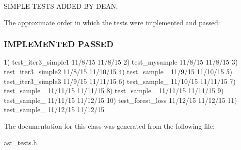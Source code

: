 S\-I\-M\-P\-L\-E T\-E\-S\-T\-S A\-D\-D\-E\-D B\-Y D\-E\-A\-N. 

The approximate order in which the tests were implemented and passed\-: \subsubsection*{I\-M\-P\-L\-E\-M\-E\-N\-T\-E\-D P\-A\-S\-S\-E\-D }

1) test\-\_\-iter3\-\_\-simple1 11/8/15 11/8/15 2) test\-\_\-mysample 11/8/15 11/8/15 3) test\-\_\-iter3\-\_\-simple2 11/8/15 11/10/15 4) test\-\_\-sample\-\_ 11/9/15 11/10/15 5) test\-\_\-iter3\-\_\-simple3 11/9/15 11/11/15 6) test\-\_\-sample\-\_ 11/10/15 11/11/15 7) test\-\_\-sample\-\_ 11/11/15 11/11/15 8) test\-\_\-sample\-\_ 11/11/15 11/11/15 9) test\-\_\-sample\-\_ 11/11/15 11/12/15 10) test\-\_\-forest\-\_\-loss 11/12/15 11/12/15 11) test\-\_\-sample\-\_ 11/12/15 11/12/15 

The documentation for this class was generated from the following file\-:\begin{DoxyCompactItemize}
\item 
ast\-\_\-tests.\-h\end{DoxyCompactItemize}
